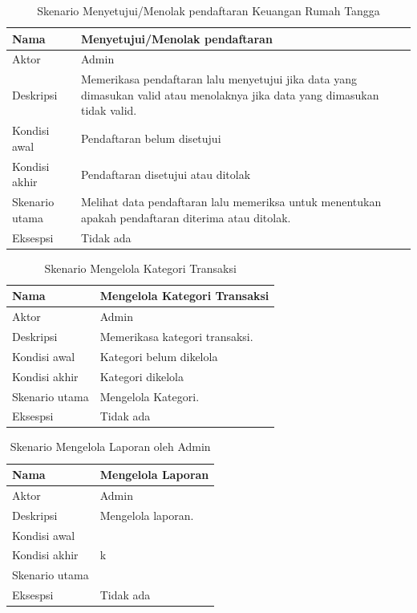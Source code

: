 \begin{table}[H]
	\centering
		\begin{tabular}{ |p{2cm}|p{10cm}| }
			\hline
			Nama & Menyetujui/Menolak pendaftaran\\ \hline
			Aktor & Admin \\ \hline
			Deskripsi & Memerikasa pendaftaran lalu menyetujui jika data yang dimasukan valid atau menolaknya jika data yang dimasukan tidak valid. \\ \hline
			Kondisi awal & Pendaftaran belum disetujui  \\ \hline
			Kondisi akhir & Pendaftaran disetujui atau ditolak \\ \hline
			Skenario utama & Melihat data pendaftaran lalu memeriksa untuk menentukan apakah pendaftaran diterima atau ditolak. \\ \hline
			Eksespsi & Tidak ada  \\ 
			\hline
		\end{tabular}
	\caption{Skenario Menyetujui/Menolak pendaftaran Keuangan Rumah Tangga}
	\label{tab:setuju/tolak}
\end{table}

\begin{table}[H]
	\centering
		\begin{tabular}{ |p{2cm}|p{10cm}| }
			\hline
			Nama & Mengelola Kategori Transaksi\\ \hline
			Aktor & Admin \\ \hline
			Deskripsi & Memerikasa kategori transaksi. \\ \hline
			Kondisi awal & Kategori belum dikelola  \\ \hline
			Kondisi akhir & Kategori dikelola \\ \hline
			Skenario utama & Mengelola Kategori. \\ \hline
			Eksespsi & Tidak ada  \\ 
			\hline
		\end{tabular}
	\caption{Skenario Mengelola Kategori Transaksi}
	\label{tab:kelolaKategori}
\end{table}

\begin{table}[H]
	\centering
		\begin{tabular}{ |p{2cm}|p{10cm}| }
			\hline
			Nama & Mengelola Laporan\\ \hline
			Aktor & Admin \\ \hline
			Deskripsi & Mengelola laporan. \\ \hline
			Kondisi awal &   \\ \hline
			Kondisi akhir & k \\ \hline
			Skenario utama &  \\ \hline
			Eksespsi & Tidak ada  \\ 
			\hline
		\end{tabular}
	\caption{Skenario Mengelola Laporan oleh Admin}
	\label{tab:kelolaLaporan}
\end{table}